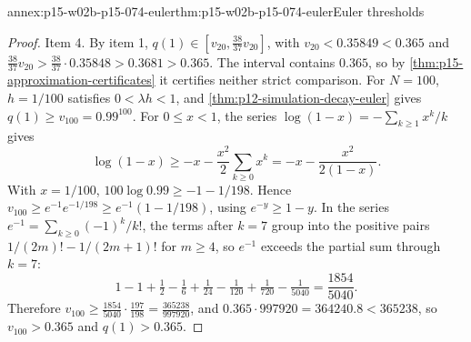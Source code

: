\begin{annexitem}{annex:p15-w02b-p15-074-euler}{thm:p15-w02b-p15-074-euler}{Euler thresholds}
\begin{proof}
Item 4. By item 1, \(q(1)\in[v_{20},\tfrac{38}{37}v_{20}]\), with
\(v_{20}<0.35849<0.365\) and
\(\tfrac{38}{37}v_{20}>\tfrac{38}{37}\cdot0.35848>0.3681>0.365\).
The interval contains \(0.365\), so by
\cref{thm:p15-approximation-certificates} it certifies neither strict
comparison. For \(N=100\), \(h=1/100\) satisfies \(0<\lambda h<1\), and
\cref{thm:p12-simulation-decay-euler} gives \(q(1)\geq v_{100}=0.99^{100}\).
For \(0\leq x<1\), the series \(\log(1-x)=-\sum_{k\geq1}x^k/k\) gives
\[
 \log(1-x)\geq-x-\frac{x^2}{2}\sum_{k\geq0}x^k=-x-\frac{x^2}{2(1-x)}.
\]
With \(x=1/100\), \(100\log0.99\geq-1-1/198\). Hence
\(v_{100}\geq e^{-1}e^{-1/198}\geq e^{-1}(1-1/198)\), using
\(e^{-y}\geq1-y\). In the series \(e^{-1}=\sum_{k\geq0}(-1)^k/k!\), the
terms after \(k=7\) group into the positive pairs
\(1/(2m)!-1/(2m+1)!\) for \(m\geq4\), so \(e^{-1}\) exceeds the partial
sum through \(k=7\):
\[
 1-1+\tfrac12-\tfrac16+\tfrac1{24}-\tfrac1{120}+\tfrac1{720}-\tfrac1{5040}
 =\frac{1854}{5040}.
\]
Therefore \(v_{100}\geq\tfrac{1854}{5040}\cdot\tfrac{197}{198}
=\tfrac{365238}{997920}\), and \(0.365\cdot997920=364240.8<365238\), so
\(v_{100}>0.365\) and \(q(1)>0.365\).
\end{proof}
\end{annexitem}

